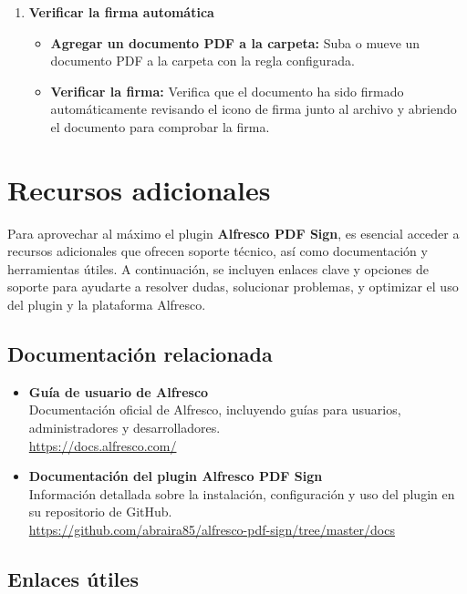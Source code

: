 \documentclass{template/ol-softwaremanual}
\begin{document}
\begin{enumerate}
	\item \textbf{Verificar la firma automática}
	\begin{itemize}
		\item \textbf{Agregar un documento PDF a la carpeta:} Suba o mueve un documento PDF a la carpeta con la regla configurada.
		\item \textbf{Verificar la firma:} Verifica que el documento ha sido firmado automáticamente revisando el icono de firma junto al archivo y abriendo el documento para comprobar la firma.
	\end{itemize}
\end{enumerate}

\section{Recursos adicionales}

Para aprovechar al máximo el plugin \textbf{Alfresco PDF Sign}, es esencial acceder a recursos adicionales que ofrecen soporte técnico, así como documentación y herramientas útiles. A continuación, se incluyen enlaces clave y opciones de soporte para ayudarte a resolver dudas, solucionar problemas, y optimizar el uso del plugin y la plataforma Alfresco.

\subsection{Documentación relacionada}

\begin{itemize}
	\item \textbf{Guía de usuario de Alfresco}\\
	Documentación oficial de Alfresco, incluyendo guías para usuarios, administradores y desarrolladores.\\
	\url{https://docs.alfresco.com/}
	
	\item \textbf{Documentación del plugin Alfresco PDF Sign}\\
	Información detallada sobre la instalación, configuración y uso del plugin en su repositorio de GitHub.\\
	\url{https://github.com/abraira85/alfresco-pdf-sign/tree/master/docs}
\end{itemize}

\subsection{Enlaces útiles}
\end{document}
